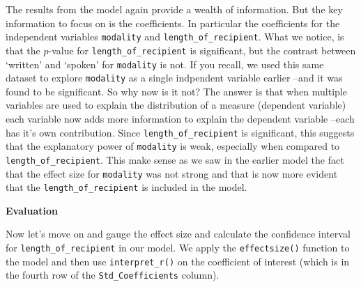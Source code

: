 \documentclass[
]{article}
\newenvironment{Shaded}{\begin{snugshade}}{\end{snugshade}}
\newcommand{\CommentTok}[1]{\textcolor[rgb]{0.56,0.35,0.01}{\textit{#1}}}
\newcommand{\DecValTok}[1]{\textcolor[rgb]{0.00,0.00,0.81}{#1}}
\newcommand{\FunctionTok}[1]{\textcolor[rgb]{0.00,0.00,0.00}{#1}}
\newcommand{\NormalTok}[1]{#1}
\newcommand{\OtherTok}[1]{\textcolor[rgb]{0.56,0.35,0.01}{#1}}
\newcommand{\SpecialCharTok}[1]{\textcolor[rgb]{0.00,0.00,0.00}{#1}}
\begin{document}
The results from the model again provide a wealth of information. But the key information to focus on is the coefficients. In particular the coefficients for the independent variables \texttt{modality} and \texttt{length\_of\_recipient}. What we notice, is that the \(p\)-value for \texttt{length\_of\_recipient} is significant, but the contrast between `written' and `spoken' for \texttt{modality} is not. If you recall, we used this same dataset to explore \texttt{modality} as a single indpendent variable earlier --and it was found to be significant. So why now is it not? The answer is that when multiple variables are used to explain the distribution of a measure (dependent variable) each variable now adds more information to explain the dependent variable --each has it's own contribution. Since \texttt{length\_of\_recipient} is significant, this suggests that the explanatory power of \texttt{modality} is weak, especially when compared to \texttt{length\_of\_recipient}. This make sense as we saw in the earlier model the fact that the effect size for \texttt{modality} was not strong and that is now more evident that the \texttt{length\_of\_recipient} is included in the model.

\textbf{Evaluation}

Now let's move on and gauge the effect size and calculate the confidence interval for \texttt{length\_of\_recipient} in our model. We apply the \texttt{effectsize()} function to the model and then use \texttt{interpret\_r()} on the coefficient of interest (which is in the fourth row of the \texttt{Std\_Coefficients} column).

\begin{Shaded}
\end{Shaded}
\end{document}

